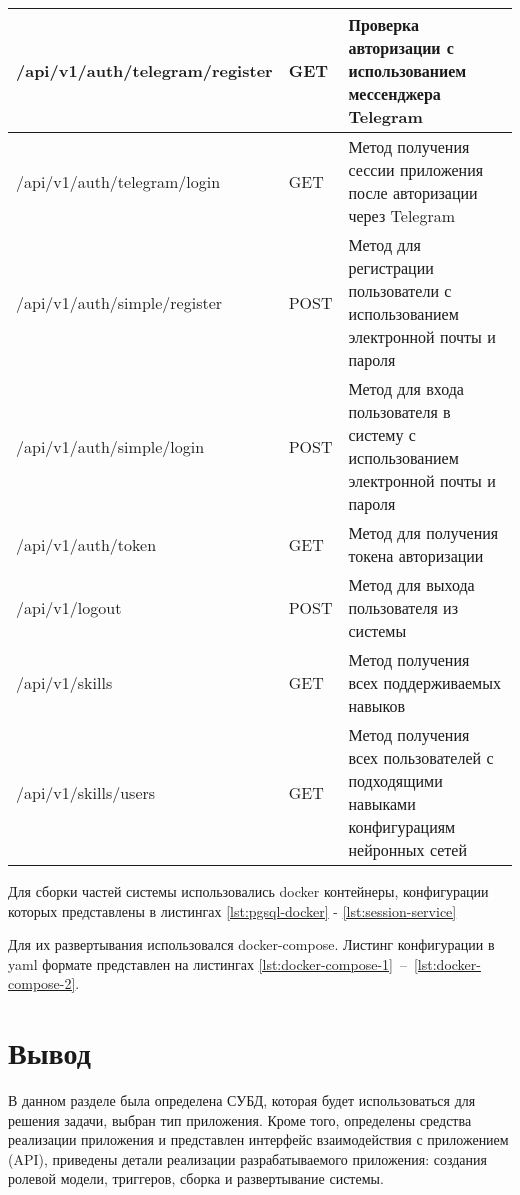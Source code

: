 \begin{landscape}
\begin{longtable}{|p{}|p{}|p{}|}
    
    /api/v1/auth/telegram/register          & GET & Проверка авторизации с использованием мессенджера Telegram \\\hline
    /api/v1/auth/telegram/login  & GET & Метод получения сессии приложения после авторизации через Telegram \\\hline
     /api/v1/auth/simple/register  & POST & Метод для регистрации пользователи с использованием электронной почты и пароля \\\hline
    /api/v1/auth/simple/login  & POST & Метод для входа пользователя в систему с использованием электронной почты и пароля \\\hline
     /api/v1/auth/token  & GET & Метод для получения токена авторизации\\\hline
    /api/v1/logout         & POST & Метод для выхода пользователя из системы \\\hline
    
    /api/v1/skills           & GET & Метод получения всех поддерживаемых навыков \\\hline
    /api/v1/skills/users          & GET & Метод получения всех пользователей с подходящими навыками конфигурациям нейронных сетей\\\hline
\end{longtable}
\end{landscape}

Для сборки частей системы использовались docker контейнеры, конфигурации которых представлены в листингах \ref{lst:pgsql-docker} - \ref{lst:session-service}

Для их развертывания использовался docker-compose. Листинг конфигурации в yaml формате представлен на листингах \ref{lst:docker-compose-1}~--~\ref{lst:docker-compose-2}.

\section{Вывод}

В данном разделе была определена СУБД, которая будет использоваться для решения задачи, выбран тип приложения. Кроме того, определены средства реализации приложения и представлен интерфейс взаимодействия с приложением (API), приведены детали реализации разрабатываемого приложения: создания ролевой модели, триггеров, сборка и развертывание системы.  

